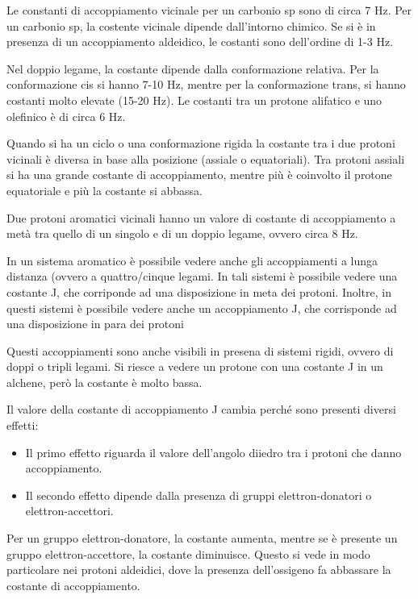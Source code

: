 Le constanti di accoppiamento vicinale per un carbonio sp sono di circa 7 Hz. Per un carbonio sp, la costente vicinale dipende dall'intorno chimico. Se si è in presenza di un accoppiamento aldeidico, le costanti sono dell'ordine di 1-3 Hz.

Nel doppio legame, la costante dipende dalla conformazione relativa. Per la conformazione cis si hanno 7-10 Hz, mentre per la conformazione trans, si hanno costanti molto elevate (15-20 Hz). Le costanti tra un protone alifatico e uno olefinico è di circa 6 Hz.

Quando si ha un ciclo o una conformazione rigida la costante tra i due protoni vicinali è diversa in base alla posizione (assiale o equatoriali). Tra protoni assiali si ha una grande costante di accoppiamento, mentre più è coinvolto il protone equatoriale e più la costante si abbassa.

Due protoni aromatici vicinali hanno un valore di costante di accoppiamento a metà tra quello di un singolo e di un doppio legame, ovvero circa 8 Hz.


In un sistema aromatico è possibile vedere anche gli accoppiamenti a lunga distanza (ovvero a quattro/cinque legami. In tali sistemi è possibile vedere una costante J, che corriponde ad una disposizione in meta dei protoni. Inoltre, in questi sistemi è possibile vedere anche un accoppiamento J, che corrisponde ad una disposizione in para dei protoni

Questi accoppiamenti sono anche visibili in presena di sistemi rigidi, ovvero di doppi o tripli legami.
Si riesce a vedere un protone con una costante J in un alchene, però la costante è molto bassa.

Il valore della costante di accoppiamento J cambia perché sono presenti diversi effetti:
\begin{itemize}
  \item Il primo effetto riguarda il valore dell'angolo diiedro tra i protoni che danno accoppiamento.
  \item Il secondo effetto dipende dalla presenza di gruppi elettron-donatori o elettron-accettori.
\end{itemize}

Per un gruppo elettron-donatore, la costante aumenta, mentre se è presente un gruppo elettron-accettore, la costante diminuisce.
Questo si vede in modo particolare nei protoni aldeidici, dove la presenza dell'ossigeno fa abbassare la costante di accoppiamento.

